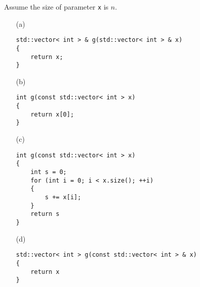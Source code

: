 
Assume the size of parameter \verb!x! is $n$.

\begin{enumerate}
\item[(a)]
\begin{Verbatim}[frame=single, fontsize=\small]
std::vector< int > & g(std::vector< int > & x)
{
    return x;
}
\end{Verbatim}
\item[(b)]
\begin{Verbatim}[frame=single, fontsize=\small]
int g(const std::vector< int > x)
{
    return x[0];
}
\end{Verbatim}
\item[(c)]
\begin{Verbatim}[frame=single, fontsize=\small]
int g(const std::vector< int > x)
{
    int s = 0;
    for (int i = 0; i < x.size(); ++i)
    {
        s += x[i];
    }
    return s
}
\end{Verbatim}
\item[(d)]
\begin{Verbatim}[frame=single, fontsize=\small]
std::vector< int > g(const std::vector< int > & x)
{
    return x
}
\end{Verbatim}
\end{enumerate}
